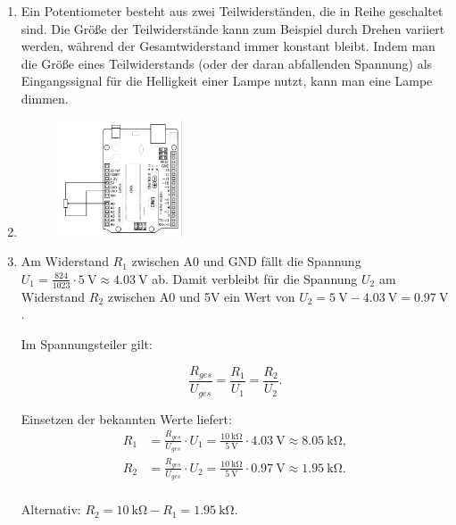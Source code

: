 \documentclass[ngerman, 11pt]{scrreprt}
\begin{document}
	\begin{enumerate}[label=\alph*), itemsep=0mm]
		\item Ein Potentiometer besteht aus zwei Teilwiderständen, die in Reihe geschaltet sind. Die Größe der Teilwiderstände kann zum Beispiel durch Drehen variiert werden, während der Gesamtwiderstand immer konstant bleibt. Indem man die Größe eines Teilwiderstands (oder der daran abfallenden Spannung) als Eingangssignal für die Helligkeit einer Lampe nutzt, kann man eine Lampe dimmen.
		\item \begin{figure}[H]
			\centering
			\includegraphics[width=0.35\textwidth]{../Zeichnungen/schaltplan-poti-an-arduino.png}
		\end{figure}
		
		\item Am Widerstand $R_1$ zwischen A0 und GND fällt die Spannung $U_1=\frac{824}{1023}\cdot \SI{5}{\volt}\approx \SI{4,03}{\volt}$ ab. Damit verbleibt für die Spannung $U_2$ am Widerstand $R_2$ zwischen A0 und 5V ein Wert von $U_2 = \SI{5}{\volt}-\SI{4,03}{\volt} = \SI{0,97}{\volt}$.
		
		Im Spannungsteiler gilt:
		
		\begin{equation*}
			\frac{R_{ges}}{U_{ges}} = \frac{R_1}{U_1} = \frac{R_2}{U_2}.
		\end{equation*}
		
		Einsetzen der bekannten Werte liefert:
		\begin{align*}
			R_1 &= \frac{R_{ges}}{U_{ges}} \cdot U_1 = \frac{\SI{10}{\kilo\ohm}}{\SI{5}{\volt}} \cdot \SI{4,03}{\volt} \approx \SI{8,05}{\kilo\ohm}, \\
			R_2 &= \frac{R_{ges}}{U_{ges}} \cdot U_2 = \frac{\SI{10}{\kilo\ohm}}{\SI{5}{\volt}} \cdot \SI{0,97}{\volt} \approx \SI{1,95}{\kilo\ohm}. \\
		\end{align*}
		
		Alternativ: $R_2=\SI{10}{\kilo\ohm} - R_1 = \SI{1,95}{\kilo\ohm}$.
	\end{enumerate}
	
\end{document}
